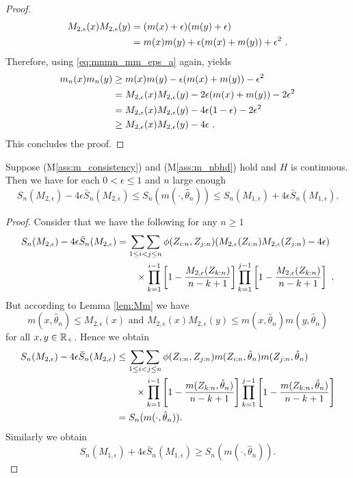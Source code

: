 \begin{lemma}
\begin{proof}
		\begin{align*}
			M_{2,\epsilon}(x)M_{2,\epsilon}(y) &= (m(x) +\epsilon)(m(y) + \epsilon)\\
			&= m(x)m(y) + \epsilon(m(x) + m(y)) + \epsilon^2\textrm{ .}
		\end{align*}
		Therefore, using \eqref{eq:mnmn_mm_eps_a} again, yields
		\begin{align*}
			m_n(x)m_n(y) &\geq m(x)m(y) - \epsilon(m(x) + m(y)) - \epsilon^2\\
			&= M_{2,\epsilon}(x) M_{2,\epsilon}(y) - 2\epsilon(m(x) + m(y)) - 2\epsilon^2\\
			&= M_{2,\epsilon}(x) M_{2,\epsilon}(y) - 4\epsilon(1-\epsilon) - 2\epsilon^2\\
			&\geq M_{2,\epsilon}(x) M_{2,\epsilon}(y) - 4\epsilon \textrm{ .}
		\end{align*}
		This concludes the proof.
	\end{proof}
\end{lemma}

\begin{cor}
	Suppose (M\ref{ass:m_consistency}) and (M\ref{ass:m_nbhd}) hold and $H$ is continuous. Then we have for each $0 < \epsilon \leq 1$ and $n$ large enough
	$$S_n(M_{2,\epsilon}) - 4\epsilon \bar{S}_n(M_{2,\epsilon}) \leq S_n(m(\cdot, \hat\theta_n)) \leq S_n(M_{1,\epsilon}) + 4\epsilon \bar{S}_n(M_{1,\epsilon})\textrm{.}$$
	\label{lem:sandwich}
	\begin{proof}
		Consider that we have the following for any $n\geq 1$
		\begin{align*}
			S_n(M_{2,\epsilon}) - 4\epsilon \bar{S}_n(M_{2,\epsilon}) &= \mathop{\sum\sum}\limits_{1\leq i<j\leq n} \phi(Z_{i:n}, Z_{j:n}) (M_{2,\epsilon}(Z_{i:n}) M_{2,\epsilon}(Z_{j:n}) - 4\epsilon) \\
			&\qquad \times \prod_{k=1}^{i-1}\left[1-\frac{M_{2,\epsilon}(Z_{k:n})}{n-k+1}\right] \prod_{k=1}^{j-1}\left[1-\frac{M_{2,\epsilon}(Z_{k:n})}{n-k+1}\right]\textrm{ .}
		\end{align*}
		But according to Lemma \ref{lem:Mm} we have 
		$$m(x,\hat\theta_n) \leq M_{2,\epsilon}(x) \textrm{ and } M_{2,\epsilon}(x)M_{2,\epsilon}(y) \leq m(x,\hat\theta_n)m(y,\hat\theta_n)$$
		for all $x,y \in \mathbb{R}_+$. Hence we obtain
		\begin{align*}
		S_n(M_{2,\epsilon}) - 4\epsilon \bar{S}_n(M_{2,\epsilon}) &\leq \mathop{\sum\sum}\limits_{1\leq i<j\leq n} \phi(Z_{i:n}, Z_{j:n}) m(Z_{i:n},\hat\theta_n)m(Z_{j:n},\hat\theta_n) \\
		&\qquad \times \prod_{k=1}^{i-1}\left[1-\frac{m(Z_{k:n},\hat\theta_n)}{n-k+1}\right] \prod_{k=1}^{j-1}\left[1-\frac{m(Z_{k:n},\hat\theta_n)}{n-k+1}\right]\\
		&= S_n(m(\cdot, \hat\theta_n))\textrm{.}
		\end{align*}
		Similarly we obtain 
		$$S_n(M_{1,\epsilon}) + 4\epsilon \bar{S}_n(M_{1,\epsilon}) \geq S_n(m(\cdot, \hat\theta_n)) \textrm{.}$$
	\end{proof}
\end{cor}


